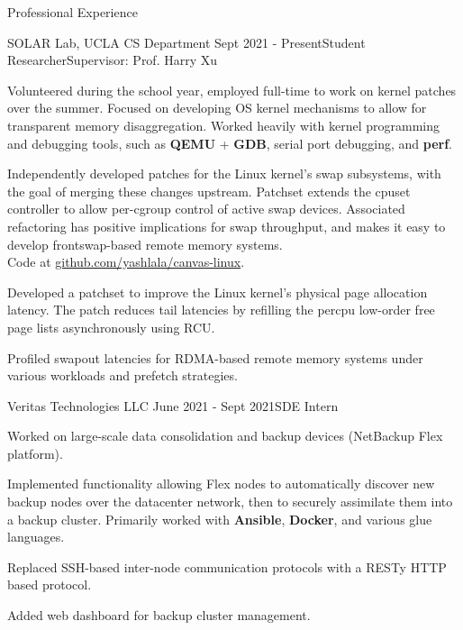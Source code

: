 \documentclass{resume} %
\begin{document}
\begin{resumeSection}{Professional Experience} \itemsep -12pt

\begin{resumeSubsection}{SOLAR Lab, UCLA CS Department} 
	{Sept 2021 - Present}{Student Researcher}{Supervisor: Prof. Harry Xu}
\item Volunteered during the school year, employed full-time to work on kernel
	patches over the summer. Focused on developing OS kernel mechanisms to
	allow for transparent memory disaggregation. Worked heavily with kernel
	programming and debugging tools, such as \textbf{QEMU} + \textbf{GDB},
	serial port debugging, and \textbf{perf}. 
\item Independently developed patches for the Linux kernel's swap subsystems,
	with the goal of merging these changes upstream. Patchset extends the
	cpuset controller to allow per-cgroup control of active swap devices.
	Associated refactoring has positive implications for swap throughput,
	and makes it easy to develop frontswap-based remote memory systems. \\
	Code at 
	\href{https://github.com/yashlala/canvas-linux}{github.com/yashlala/canvas-linux}.
\item Developed a patchset to improve the Linux kernel's physical page
	allocation latency. The patch reduces tail latencies by refilling the
	percpu low-order free page lists asynchronously using RCU. 
\item Profiled swapout latencies for RDMA-based remote memory systems under
	various workloads and prefetch strategies. 
\end{resumeSubsection}

\begin{resumeSubsection}{Veritas Technologies LLC}
	{June 2021 - Sept 2021}{SDE Intern}{}
\item Worked on large-scale data consolidation and backup devices (NetBackup
	Flex platform). 
\item Implemented functionality allowing Flex nodes to automatically discover
	new backup nodes over the datacenter network, then to securely
	assimilate them into a backup cluster. Primarily worked with
	\textbf{Ansible}, \textbf{Docker}, and various glue languages. 
\item Replaced SSH-based inter-node communication protocols with a RESTy HTTP
	based protocol. 
\item Added web dashboard for backup cluster management. 
\end{resumeSubsection}


\end{resumeSection}
\end{document}
